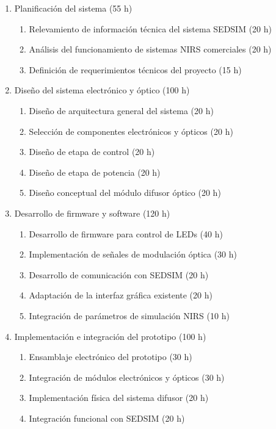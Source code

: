 \documentclass[
11pt, %
]{charter}
\begin{document}

\begin{enumerate}

\item Planificación del sistema (55 h)
	\begin{enumerate}
	\item Relevamiento de información técnica del sistema SEDSIM (20 h)
	\item Análisis del funcionamiento de sistemas NIRS comerciales (20 h)
	\item Definición de requerimientos técnicos del proyecto (15 h)
	\end{enumerate}

\item Diseño del sistema electrónico y óptico (100 h)
	\begin{enumerate}
	\item Diseño de arquitectura general del sistema (20 h)
	\item Selección de componentes electrónicos y ópticos (20 h)
	\item Diseño de etapa de control (20 h)
	\item Diseño de etapa de potencia (20 h)
	\item Diseño conceptual del módulo difusor óptico (20 h)
	\end{enumerate}

\item Desarrollo de firmware y software (120 h)
	\begin{enumerate}
	\item Desarrollo de firmware para control de LEDs (40 h)
	\item Implementación de señales de modulación óptica (30 h)
	\item Desarrollo de comunicación con SEDSIM (20 h)
	\item Adaptación de la interfaz gráfica existente (20 h)
	\item Integración de parámetros de simulación NIRS (10 h)
	\end{enumerate}

\item Implementación e integración del prototipo (100 h)
	\begin{enumerate}
	\item Ensamblaje electrónico del prototipo (30 h)
	\item Integración de módulos electrónicos y ópticos (30 h)
	\item Implementación física del sistema difusor (20 h)
	\item Integración funcional con SEDSIM (20 h)
	\end{enumerate}


\end{enumerate}
\end{document}
